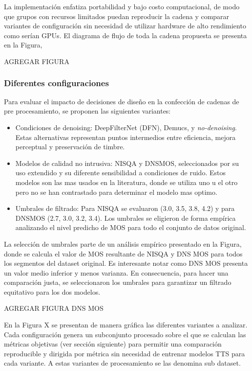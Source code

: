 La implementación enfatiza portabilidad y bajo costo computacional, de modo que grupos con recursos limitados puedan reproducir la cadena y comparar variantes de configuración sin necesidad de utilizar hardware de alto rendimiento como serían GPUs. El diagrama de flujo de toda  la cadena propuesta se presenta en la Figura,

AGREGAR FIGURA


\subsubsection{Diferentes configuraciones}

Para evaluar el impacto de decisiones de diseño en la confección de cadenas de pre procesamiento, se proponen las siguientes variantes:

\begin{itemize}
    \item Condiciones de denoising: DeepFilterNet (DFN), Demucs, y \emph{no-denoising}. Estas alternativas representan puntos intermedios entre eficiencia, mejora perceptual y preservación de timbre. 
    \item Modelos de calidad no intrusiva: NISQA y DNSMOS, seleccionados por su uso extendido y su diferente sensibilidad a condiciones de ruido. Estos modelos son las mas usados en la literatura, donde se utiliza uno u el otro pero no se han contrastado para determinar el modelo mas optimo. 
    \item Umbrales de filtrado: Para NISQA se evaluaron (3.0, 3.5, 3.8, 4.2) y para DNSMOS (2.7, 3.0, 3.2, 3.4). Los umbrales se eligieron de forma empírica analizando el nivel predicho de MOS para todo el conjunto de datos original. 
\end{itemize}

La selección de umbrales parte de un análisis empírico presentado en la Figura, donde se calcula el valor de MOS resultante de NISQA y DNS MOS para todos los segmentos del dataset original. Es interesante notar como DNS MOS presenta un valor medio inferior y menos varianza. En consecuencia, para hacer una comparación justa, se seleccionaron los umbrales para garantizar un filtrado equitativo para los dos modelos.

AGREGAR FIGURA DNS MOS

En la Figura X se presentan de manera gráfica las diferentes variantes a analizar. Cada configuración genera un subconjunto procesado sobre el que se calculan las métricas objetivas (ver sección siguiente) para permitir una comparación reproducible y dirigida por métrica sin necesidad de entrenar modelos TTS para cada variante. A estas variantes de procesamiento se las denomina sub dataset.

